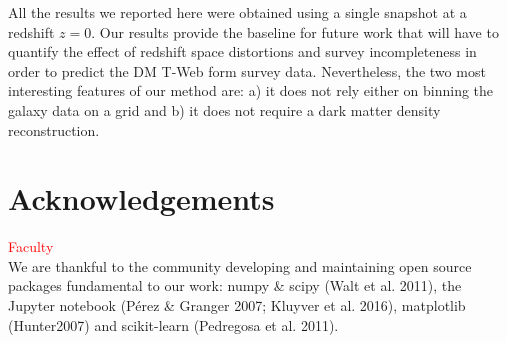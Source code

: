 \documentclass[usenatbib]{mnras}
\begin{document}
All the results we reported here were obtained using a single snapshot at a 
redshift $z=0$.
Our results provide the baseline for future work that will have to quantify 
the effect of redshift space distortions and survey incompleteness in order to
predict  the DM T-Web form survey data.
Nevertheless, the two most interesting features of our method are: a) it does not
rely either on binning the galaxy data on a grid and b) it does not require 
a dark matter density reconstruction.



\section*{Acknowledgements}
\textcolor{red}{Faculty}\\
We are thankful to the community developing and maintaining open source packages fundamental to our work: numpy
\&  scipy  (Walt  et  al.  2011),  the  Jupyter  notebook  (P\'erez \& Granger 2007; Kluyver et al. 2016), matplotlib (Hunter2007) and  scikit-learn (Pedregosa et al. 2011).






\bsp	%
\label{lastpage}
\end{document}
